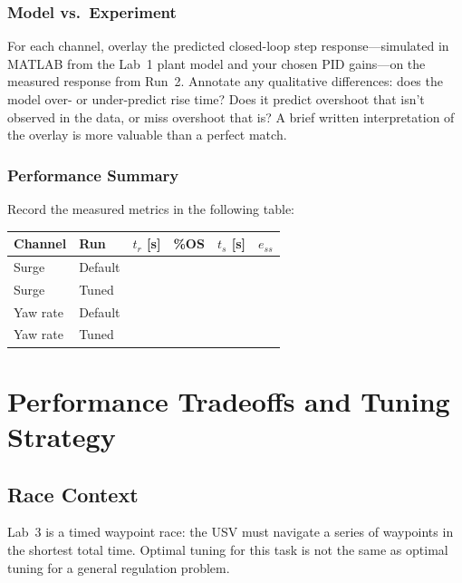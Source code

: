 \documentclass[../../book.tex]{subfiles}
\begin{document}
\subsubsection{Model vs.\ Experiment}

For each channel, overlay the predicted closed-loop step response---simulated in MATLAB from the Lab~1 plant model and your chosen PID gains---on the measured response from Run~2.  Annotate any qualitative differences: does the model over- or under-predict rise time?  Does it predict overshoot that isn't observed in the data, or miss overshoot that is?  A brief written interpretation of the overlay is more valuable than a perfect match.

\subsubsection{Performance Summary}

Record the measured metrics in the following table:

\vspace{6pt}
\begin{center}
\begin{tabular}{C{1.8cm} C{1.8cm} C{1.8cm} C{1.8cm} C{1.8cm} C{1.8cm}}
  \textbf{Channel} & \textbf{Run} & \textbf{$t_r$ [s]} & \textbf{\%OS} & \textbf{$t_s$ [s]} & \textbf{$e_{ss}$} \\
  \midrule
  Surge    & Default & & & & \\[6pt]
  Surge    & Tuned   & & & & \\[6pt]
  Yaw rate & Default & & & & \\[6pt]
  Yaw rate & Tuned   & & & & \\[6pt]
  \bottomrule
\end{tabular}
\end{center}
\vspace{6pt}

\section{Performance Tradeoffs and Tuning Strategy}
\label{sec:tradeoffs}

\subsection{Race Context}

Lab~3 is a timed waypoint race: the USV must navigate a series of waypoints in the shortest total time.  Optimal tuning for this task is not the same as optimal tuning for a general regulation problem.
\end{document}
